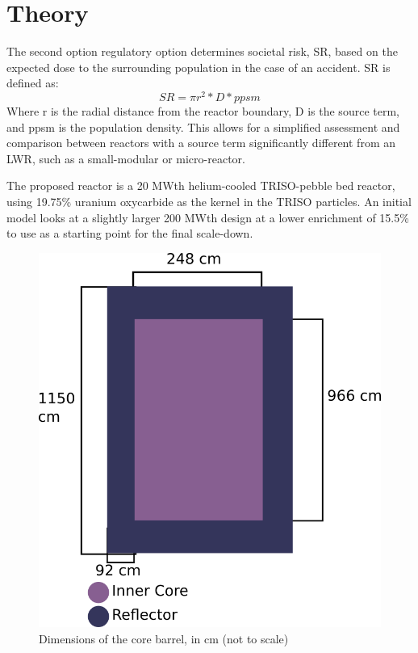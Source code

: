 \documentclass{anstrans}
\begin{document}
\section{Theory}
The second option regulatory option determines societal risk, SR, based on the expected dose to the surrounding population in the case of an accident.  SR is defined as:
\begin{subequations} \label{eqs:NRCSR}
\begin{equation} \label{eq:SRspecific}
SR = \pi r^{2} * D * ppsm
\end{equation}
\end{subequations}
Where r is the radial distance from the reactor boundary, D is the source term, and ppsm is the population density.  This allows for a simplified assessment and comparison between reactors with a source term significantly different from an LWR, such as a small-modular or micro-reactor.

The proposed reactor is a 20 MWth helium-cooled TRISO-pebble bed reactor, using 19.75\% uranium oxycarbide as the kernel in the TRISO particles.  An initial model looks at a slightly larger 200 MWth design at a lower enrichment of 15.5\% to use as a starting point for the final scale-down.
\begin{figure}[H]
  \centering
  \includegraphics[width = \linewidth]{reactor-geom}
  \caption{Dimensions of the core barrel, in cm (not to scale)}
  \label{fig:voltage}
\end{figure}
\end{document}
